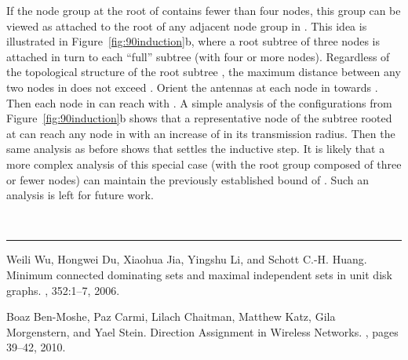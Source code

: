 \documentclass[11pt]{article}
\newcommand{\qed}{\rule{0.5em}{1.5ex}}
\newcommand{\fqed}{{\hfill~\qed}}
\newenvironment{proof}{{\noindent \bf Proof.}}
                      {{\hfill \fqed} \vspace{1em}}
\begin{document}
\begin{proof}
If the node group at the root of  contains fewer than four nodes,
this group can be viewed as attached to the root  of any adjacent node group
in . This idea is illustrated in Figure~\ref{fig:90induction}b, where
a root subtree of three nodes is attached in turn to each ``full'' subtree (with four or more nodes).
Regardless of the topological structure of the root subtree , the
maximum distance between any two nodes in  does not exceed .
Orient the antennas at each node in  towards . Then
each node in  can reach  with . A simple analysis
of the configurations from Figure~\ref{fig:90induction}b shows that
a representative node of the subtree rooted at  can reach any node in 
with an increase of  in its transmission radius. Then the same analysis
as before shows that  settles the inductive step. It is likely that
a more complex analysis of this special case (with the root group composed of
three or fewer nodes) can maintain the previously established bound of .
Such an analysis is left for future work.
\end{proof}


\begin{thebibliography}{1}

Weili Wu, Hongwei Du, Xiaohua Jia, Yingshu Li, and Schott C.-H. Huang.
\newblock Minimum connected dominating sets and maximal independent sets in
  unit disk graphs.
, 352:1--7, 2006.

Boaz Ben-Moshe, Paz Carmi, Lilach Chaitman, Matthew Katz, Gila Morgenstern, and Yael Stein.
\newblock Direction Assignment in Wireless Networks.
, pages 39--42,  2010.


\end{thebibliography}
\end{document}
